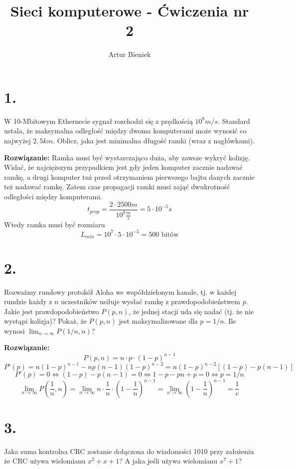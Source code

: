 \documentclass{article}
\begin{document}
\title{Sieci komputerowe - Ćwiczenia nr 2}
\author{Artur Bieniek}

\maketitle

\section*{1.} W 10-Mbitowym Ethernecie sygnał rozchodzi się z prędkością $10^8 m/s$. Standard ustala, że maksymalna odległość między dwoma komputerami może wynosić co najwyżej $2,5 km$. Oblicz, jaka jest minimalna długość ramki (wraz z nagłówkami).

\textbf{Rozwiązanie:} Ramka musi być wystarczająco duża, aby zawsze wykryć kolizję. Widać, że najcięższym przypadkiem jest gdy jeden komputer zacznie nadawać ramkę, a drugi komputer tuż przed otrzymaniem pierwszego bajtu danych zacznie też nadawać ramkę. Zatem czas propagacji ramki musi zająć dwukrotność odległości między komputerami.
\[
    t_{prop} = \frac{2\cdot 2500m}{10^8\frac{m}{s}} = 5\cdot 10^{-5} s
\]
Wtedy ramka musi być rozmiaru
\[
    L_{min} = 10^7\cdot 5 \cdot 10^{-5} = 500 \text{ bitów}
\]

\section*{2.} Rozważmy rundowy protokół Aloha we współdzielonym kanale, tj. w każdej rundzie każdy z $n$ uczestników usiłuje wysłać ramkę z prawdopodobieństwem $p$. Jakie jest prawdopodobieństwo $P(p, n)$, że jednej stacji uda się nadać (tj. że nie wystąpi kolizja)? Pokaż, że $P(p, n)$ jest maksymalizowane dla $p = 1/n$. Ile wynosi $\lim_{n\rightarrow \infty} P(1/n, n)$?

\textbf{Rozwiązanie:}
\[
    P(p,n) = n \cdot p \cdot (1-p)^{n-1}
\]
\[
    P'(p) = n(1-p)^{n-1} - np(n-1)(1-p)^{n-2} = n(1-p)^{n-2}[(1-p)-p(n-1)]
\]
\[
    P'(p) = 0 \iff (1-p)-p(n-1) = 0 \iff 1-p-pn+p = 0 \iff p=1/n
\]
\[
    \lim_{n \rightarrow \infty}P(\frac{1}{n}, n) = \lim_{n \rightarrow \infty}n \cdot \frac{1}{n} \cdot {(1-\frac{1}{n})}^{n-1} = \lim_{n \rightarrow \infty}{(1-\frac{1}{n})}^{n-1} = \frac{1}{e}
\]

\section*{3.}
Jaka suma kontrolna CRC zostanie dołączona do wiadomości 1010 przy założeniu że CRC używa wielomianu $x^2 + x + 1$? A jaka jeśli używa wielomianu $x^7 + 1$?
\end{document}
